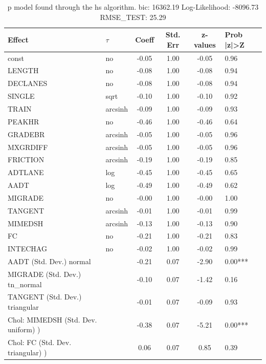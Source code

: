 \begin{table}
	\caption{p model found through the hs algorithm. bic: 16362.19 Log-Likelihood: -8096.73 RMSE_TEST: 25.29}
	\begin{center}
		\begin{tabular}{|l|l|c|c|c|l|}
			\hline
			Effect & $\tau$ & Coeff & Std. Err & z-values & Prob |z|>Z \\
			\hline
			const & no & -0.05 & 1.00 & -0.05 & 0.96 \\
			\hline
			LENGTH & no & -0.08 & 1.00 & -0.08 & 0.94 \\
			\hline
			DECLANES & no & -0.08 & 1.00 & -0.08 & 0.94 \\
			\hline
			SINGLE & sqrt & -0.10 & 1.00 & -0.10 & 0.92 \\
			\hline
			TRAIN & arcsinh & -0.09 & 1.00 & -0.09 & 0.93 \\
			\hline
			PEAKHR & no & -0.46 & 1.00 & -0.46 & 0.64 \\
			\hline
			GRADEBR & arcsinh & -0.05 & 1.00 & -0.05 & 0.96 \\
			\hline
			MXGRDIFF & arcsinh & -0.05 & 1.00 & -0.05 & 0.96 \\
			\hline
			FRICTION & arcsinh & -0.19 & 1.00 & -0.19 & 0.85 \\
			\hline
			ADTLANE & log & -0.45 & 1.00 & -0.45 & 0.65 \\
			\hline
			AADT & log & -0.49 & 1.00 & -0.49 & 0.62 \\
			\hline
			MIGRADE & no & -0.00 & 1.00 & -0.00 & 1.00 \\
			\hline
			TANGENT & arcsinh & -0.01 & 1.00 & -0.01 & 0.99 \\
			\hline
			MIMEDSH & arcsinh & -0.13 & 1.00 & -0.13 & 0.90 \\
			\hline
			FC & no & -0.21 & 1.00 & -0.21 & 0.83 \\
			\hline
			INTECHAG & no & -0.02 & 1.00 & -0.02 & 0.99 \\
			\hline
			AADT (Std. Dev.) normal &  & -0.21 & 0.07 & -2.90 & 0.00*** \\
			\hline
			MIGRADE (Std. Dev.) tn_normal &  & -0.10 & 0.07 & -1.42 & 0.16 \\
			\hline
			TANGENT (Std. Dev.) triangular &  & -0.01 & 0.07 & -0.09 & 0.93 \\
			\hline
			 Chol: MIMEDSH (Std. Dev. uniform) ) &  & -0.38 & 0.07 & -5.21 & 0.00*** \\
			\hline
			 Chol: FC (Std. Dev. triangular) ) &  & 0.06 & 0.07 & 0.85 & 0.39 \\

\end{tabular}
\end{center}
\end{table}
